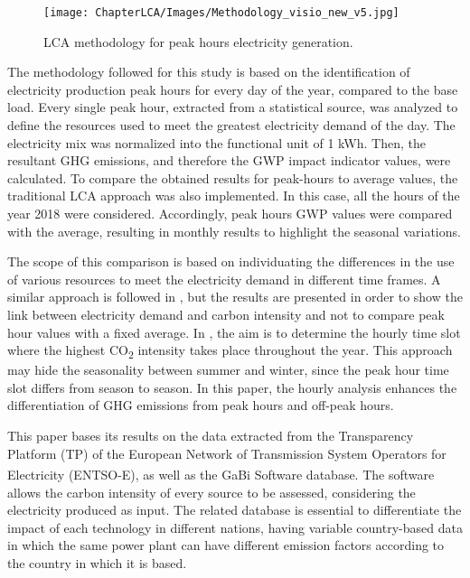 \begin{figure}[]
	\centering
	\texttt{[image: ChapterLCA/Images/Methodology\_visio\_new\_v5.jpg]}
		\caption{LCA methodology for peak hours electricity generation.}%
	\label{Methodology}
\end{figure}


{The methodology followed for this study is based on the identification of electricity production peak hours for every day of the year, compared to the base load.} Every single peak hour, {extracted from a statistical source}, was analyzed to define the resources used to meet the greatest electricity demand of the day. The electricity mix was normalized into the functional unit of 1 kWh. Then, the resultant GHG emissions, and therefore the GWP impact indicator values, were calculated. To compare the obtained results for peak-hours to average values, the traditional LCA approach was also implemented. In this case, all the hours of the year 2018 were considered. Accordingly, peak hours GWP values were compared with the average, resulting in monthly results to highlight the seasonal variations. 

{The scope of this comparison is based on individuating the differences in the use of various resources to meet the electricity demand in different time frames}.  A similar approach is followed in \cite{Khan2018, Khan2018AnalysisIntensity, Cubi2015IncorporationAssessment}, but the results are presented in order to show the link between electricity demand and carbon intensity and not to compare peak hour values with a fixed average. In \cite{Nilsson2017AssessingEmissions}, the aim is to determine the hourly time slot where the highest CO\textsubscript2 intensity takes place throughout the year. This approach may hide the seasonality between summer and winter, since the peak hour time slot differs from season to season. In this paper, the hourly analysis enhances the differentiation of GHG emissions from peak hours and off-peak hours. 

This paper bases its results on the data extracted from the Transparency Platform (TP) of the European Network of Transmission System Operators for Electricity (ENTSO-E), as well as the GaBi\textsuperscript{\textregistered} Software database. {The software allows the carbon intensity of every source to be assessed, considering the electricity produced as input. The related database is essential to differentiate the impact of each technology in different nations, having variable country-based data in which the same power plant can have different emission factors according to the country in which it is based}.
 
